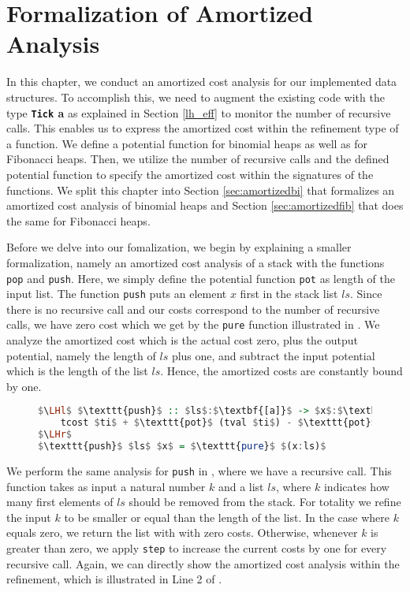 \documentclass{clmthesis}
\begin{document}
\chapter{Formalization of Amortized Analysis}\label{sec:formalization}
In this chapter, we conduct an amortized cost analysis for our implemented data structures. To accomplish this, we need to augment the existing code with the type \textbf{\lstinline{Tick} a} as explained in Section \ref{lh_eff} to monitor the number of recursive calls. This enables us to express the amortized cost within the refinement type of a function. We define a potential function for binomial heaps as well as for Fibonacci heaps. Then, we utilize the number of recursive calls and the defined potential function to specify the amortized cost within the signatures of the functions.
We split this chapter into Section \ref{sec:amortizedbi} that formalizes an amortized cost analysis of binomial heaps and Section \ref{sec:amortizedfib} that does the same for Fibonacci heaps. 

Before we delve into our fomalization, we begin by explaining a smaller formalization, namely an amortized cost analysis of a stack with the functions \texttt{pop} and \texttt{push}. Here, we simply define the potential function \texttt{pot} as length of the input list. The function \texttt{push} puts an element $x$ first in the stack list $ls$. Since there is no recursive call and our costs correspond to the number of recursive calls, we have zero cost which we get by the \texttt{pure} function illustrated in .
We analyze the amortized cost which is the actual cost zero, plus the output potential, namely the length of $ls$ plus one, and subtract the input potential which is the length of the list $ls$. Hence, the amortized costs are constantly bound by one.

\begin{figure}[h]
\begin{lstlisting}[mathescape=true, language=haskell, caption={Amortized cost analysis of \texttt{push}.},captionpos=b, label=fig:push]	
$\LHl$ $\texttt{push}$ :: $ls$:$\textbf{[a]}$ -> $x$:$\textbf{a}$ -> {$ti$:$\textbf{Tick [a]}$ |
	tcost $ti$ + $\texttt{pot}$ (tval $ti$) - $\texttt{pot}$ $ls$ $\leq$ 1} 
$\LHr$
$\texttt{push}$ $ls$ $x$ = $\texttt{pure}$ $(x:ls)$
\end{lstlisting}
\end{figure}

We perform the same analysis for \texttt{push} in , where we have a recursive call. This function takes as input a natural number $k$ and a list $ls$, where $k$ indicates how many first elements of $ls$ should be removed from the stack. For totality we refine the input $k$ to be smaller or equal than the length of the list.
In the case where $k$ equals zero, we return the list with with zero costs. Otherwise, whenever $k$ is greater than zero, we apply \texttt{step} to increase the current costs by one for every recursive call. Again, we can directly show the amortized cost analysis within the refinement, which is illustrated in Line 2 of .
\end{document}
